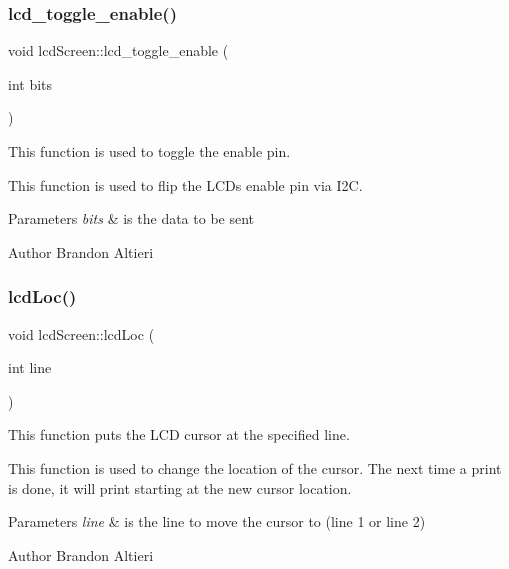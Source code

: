 \subsubsection{\texorpdfstring{lcd\+\_\+toggle\+\_\+enable()}{lcd\_toggle\_enable()}}
{\footnotesize\ttfamily void lcd\+Screen\+::lcd\+\_\+toggle\+\_\+enable (\begin{DoxyParamCaption}\item[{int}]{bits }\end{DoxyParamCaption})\hspace{0.3cm}{\ttfamily [private]}}



This function is used to toggle the enable pin. 

This function is used to flip the L\+CD\textquotesingle{}s enable pin via I2C.


\begin{DoxyParams}{Parameters}
{\em bits} & is the data to be sent \\
\hline
\end{DoxyParams}
\begin{DoxyAuthor}{Author}
Brandon Altieri 
\end{DoxyAuthor}
\mbox{\label{classlcdScreen_acb273429c19f2f18a42945bf1b69af28}} 
\subsubsection{\texorpdfstring{lcd\+Loc()}{lcdLoc()}}
{\footnotesize\ttfamily void lcd\+Screen\+::lcd\+Loc (\begin{DoxyParamCaption}\item[{int}]{line }\end{DoxyParamCaption})\hspace{0.3cm}{\ttfamily [private]}}



This function puts the L\+CD cursor at the specified line. 

This function is used to change the location of the cursor. The next time a print is done, it will print starting at the new cursor location.


\begin{DoxyParams}{Parameters}
{\em line} & is the line to move the cursor to (line 1 or line 2) \\
\hline
\end{DoxyParams}
\begin{DoxyAuthor}{Author}
Brandon Altieri 
\end{DoxyAuthor}
\mbox{\label{classlcdScreen_a58dd837a0783c439a50d11df6fc19d43}} 
